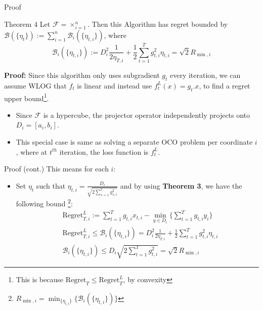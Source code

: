 \documentclass[
	11pt, %
]{beamer}
\begin{document}
\begin{frame}{Proof}
    \begin{block}{Theorem 4}
        Let $\mathcal{F} = \times_{i = 1}^{n}$. Then this Algorithm has regret bounded by $\mathcal{B} \left({\{\eta_{t}\}}\right) := \sum_{i=1}^{n} \mathcal{B}_i \left({\{\eta_{t,i}\}}\right)$, where
        $$
        \mathcal{B}_i \left({\{\eta_{t,i}\}}\right) := D_i^2 \frac{1}{2 \eta_{T,i}} + \frac{1}{2} \sum_{t=1}^{T} g_{t,i}^2 \eta_{t,i} = \sqrt{2}R_{\min,i}
        $$
    \end{block}
    \textbf{Proof:} Since this algorithm only uses subgradient $g_t$ every iteration, we can assume WLOG that $f_t$ is linear and instead use $f_t^L(x) = g_t.x$, to find a regret upper bound\footnote{This is because $\text{Regret}_{T} \le \text{Regret}_{T}^{L}$, by convexity}.
    \begin{itemize}
        \item Since $\mathcal{F}$ is a hypercube, the projector operator independently projects onto $D_i = [a_i, b_i]$.
        \item This special case is same as solving a separate OCO problem per coordinate $i$, where at $t^{th}$ iteration, the loss function is $f_t^L$.
    \end{itemize}
\end{frame}

\begin{frame}{Proof (cont.)}
    This means for each $i$:
    \begin{itemize}
        \item Set $\eta_t$ such that $\eta_{t,i} = \frac{D_i}{\sqrt{2 \sum_{s=1}^{t} g_{s,i}^2}}$ and by using \textbf{Theorem 3}, we have the following bound \footnote{$R_{\min,i} = \min_{{\{\eta_{t,i}\}}} \{ \mathcal{B}_i \left({\{\eta_{t,i}\}}\right) \}$}:
        $$
        \begin{aligned}
            & \text{Regret}_{T,i}^L := \sum_{t=1}^{T} g_{t,i}x_{t,i} - \min_{y \in D_i} \{ \sum_{t=1}^{T} g_{t,i}y_i \} \\
            & \text{Regret}_{T,i}^L \le \mathcal{B}_i \left({\{\eta_{t,i}\}}\right) = D_i^2 \frac{1}{2 \eta_{T,i}} + \frac{1}{2} \sum_{t=1}^{T} g_{t,i}^2 \eta_{t,i} \\
            & \mathcal{B}_i \left({\{\eta_{t,i}\}}\right) \le D_i\sqrt{2 \sum_{t=1}^{T} g_{t,i}^2} = \sqrt{2}R_{\min,i}
        \end{aligned}
        $$
    \end{itemize}
\end{frame}
\end{document}
